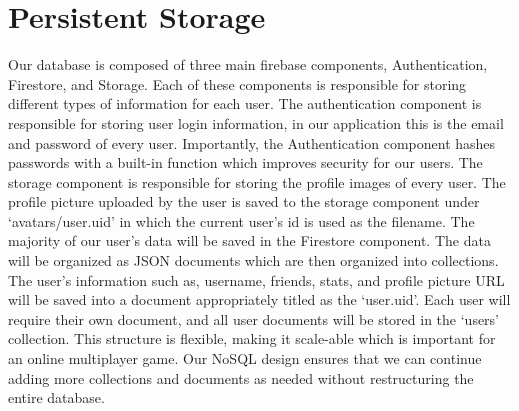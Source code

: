 \section{Persistent Storage}
Our database is composed of three main firebase components, Authentication, Firestore, and Storage. Each of these components is responsible for storing different types of information for each user. The authentication component is responsible for storing user login information, in our application this is the email and password of every user. Importantly, the Authentication component hashes passwords with a built-in function which improves security for our users. The storage component is responsible for storing the profile images of every user. The profile picture uploaded by the user is saved to the storage component under `avatars/user.uid' in which the current user's id is used as the filename. The majority of our user's data will be saved in the Firestore component. The data will be organized as JSON documents which are then organized into collections. The user's information such as, username, friends, stats, and profile picture URL will be saved into a document appropriately titled as the `user.uid'. Each user will require their own document, and all user documents will be stored in the `users' collection. This structure is flexible, making it scale-able which is important for an online multiplayer game. Our NoSQL design ensures that we can continue adding more collections and documents as needed without restructuring the entire database.
